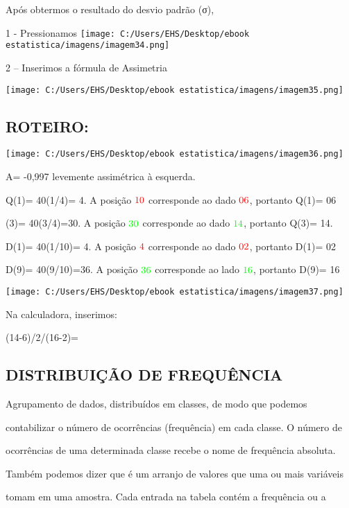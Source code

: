 \documentclass[]{book}
\begin{document}
Após obtermos o resultado do desvio padrão (σ),

1 - Pressionamos \texttt{[image: C:/Users/EHS/Desktop/ebook estatistica/imagens/imagem34.png]}

2 -- Inserimos a fórmula de Assimetria

\texttt{[image: C:/Users/EHS/Desktop/ebook estatistica/imagens/imagem35.png]}

\hypertarget{roteiro}{%
\subsection{ROTEIRO:}\label{roteiro}}

\texttt{[image: C:/Users/EHS/Desktop/ebook estatistica/imagens/imagem36.png]}

A= -0,997 levemente assimétrica à esquerda.

Q(1)= 40(1/4)= 4. A posição \(\color{red}{\text{10}}\) corresponde ao dado \(\color{red}{\text{06}}\), portanto Q(1)= 06

(3)= 40(3/4)=30. A posição \(\color{green}{\text{30}}\) corresponde ao dado \(\color{green}{\text{14}}\), portanto Q(3)= 14.

D(1)= 40(1/10)= 4. A posição \(\color{red}{\text{4}}\) corresponde ao dado \(\color{red}{\text{02}}\), portanto D(1)= 02

D(9)= 40(9/10)=36. A posição \(\color{green}{\text{36}}\) corresponde ao lado \(\color{green}{\text{16}}\), portanto D(9)= 16

\texttt{[image: C:/Users/EHS/Desktop/ebook estatistica/imagens/imagem37.png]}

Na calculadora, inserimos:

(14-6)/2/(16-2)=

\hypertarget{distribuicao-de-frequencia}{%
\subsection{DISTRIBUIÇÃO DE FREQUÊNCIA}\label{distribuicao-de-frequencia}}

Agrupamento de dados, distribuídos em classes, de modo que podemos

contabilizar o número de ocorrências (frequência) em cada classe. O número de

ocorrências de uma determinada classe recebe o nome de frequência absoluta.

Também podemos dizer que é um arranjo de valores que uma ou mais variáveis

tomam em uma amostra. Cada entrada na tabela contém a frequência ou a
\end{document}
